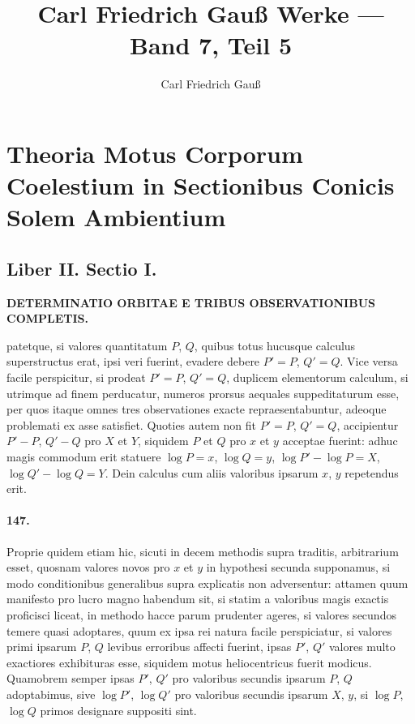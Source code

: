 \documentclass[12pt,a4paper]{article}
\title{Carl Friedrich Gau{\ss} Werke --- Band 7, Teil 5}
\author{Carl Friedrich Gau{\ss}}
\date{}
\begin{document}
\maketitle
\thispagestyle{empty}

\section*{Theoria Motus Corporum Coelestium in Sectionibus Conicis Solem Ambientium}

\subsection*{Liber II. Sectio I.}

\begin{center}
\textbf{DETERMINATIO ORBITAE E TRIBUS OBSERVATIONIBUS COMPLETIS.}
\end{center}

patetque, si valores quantitatum $P$, $Q$, quibus totus hucusque calculus superstructus erat, ipsi veri fuerint, evadere debere $P' = P$, $Q' = Q$. Vice versa facile perspicitur, si prodeat $P' = P$, $Q' = Q$, duplicem elementorum calculum, si utrimque ad finem perducatur, numeros prorsus aequales suppeditaturum esse, per quos itaque omnes tres observationes exacte repraesentabuntur, adeoque problemati ex asse satisfiet. Quoties autem non fit $P' = P$, $Q' = Q$, accipientur $P' - P$, $Q' - Q$ pro $X$ et $Y$, siquidem $P$ et $Q$ pro $x$ et $y$ acceptae fuerint: adhuc magis commodum erit statuere $\log P = x$, $\log Q = y$, $\log P' - \log P = X$, $\log Q' - \log Q = Y$. Dein calculus cum aliis valoribus ipsarum $x$, $y$ repetendus erit.

\paragraph{147.}
Proprie quidem etiam hic, sicuti in decem methodis supra traditis, arbitrarium esset, quosnam valores novos pro $x$ et $y$ in hypothesi secunda supponamus, si modo conditionibus generalibus supra explicatis non adversentur: attamen quum manifesto pro lucro magno habendum sit, si statim a valoribus magis exactis proficisci liceat, in methodo hacce parum prudenter ageres, si valores secundos temere quasi adoptares, quum ex ipsa rei natura facile perspiciatur, si valores primi ipsarum $P$, $Q$ levibus erroribus affecti fuerint, ipsas $P'$, $Q'$ valores multo exactiores exhibituras esse, siquidem motus heliocentricus fuerit modicus. Quamobrem semper ipsas $P'$, $Q'$ pro valoribus secundis ipsarum $P$, $Q$ adoptabimus, sive $\log P'$, $\log Q'$ pro valoribus secundis ipsarum $X$, $y$, si $\log P$, $\log Q$ primos designare suppositi sint.
\end{document}
